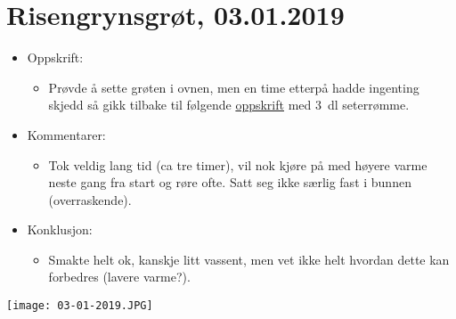 \documentclass[12pt]{article}
\begin{document}
\section*{Risengrynsgrøt, 03.01.2019}
\begin{itemize}
\item Oppskrift:
  \begin{itemize}
  \item Prøvde å sette grøten i ovnen, men en time etterpå hadde
    ingenting skjedd så gikk tilbake til f{\o}lgende
    \href{https://www.melk.no/Oppskrifter/Groeter/Tradisjonsgroet/Risengrynsgroet}{oppskrift}
    med 3~dl seterr{\o}mme.
  \end{itemize}
\item Kommentarer:
  \begin{itemize}
    \item Tok veldig lang tid (ca tre timer), vil nok kjøre på med
      høyere varme neste gang fra start og røre ofte. Satt seg ikke
      særlig fast i bunnen (overraskende).
  \end{itemize}
\item Konklusjon:
  \begin{itemize}
  \item Smakte helt ok, kanskje litt vassent, men vet ikke helt hvordan dette kan forbedres (lavere varme?). 
  \end{itemize}
\end{itemize}
\centering
\texttt{[image: 03-01-2019.JPG]}
\end{document}
